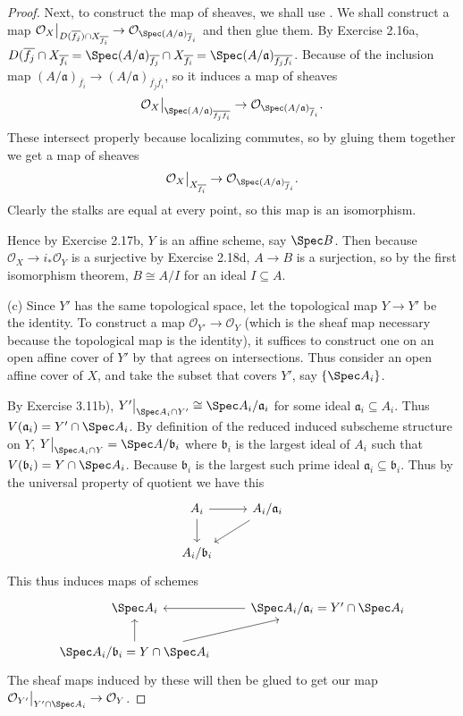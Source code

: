 \begin{proof}
	Next, to construct the map of sheaves, we shall use .
	We shall construct a map $\mathcal{O}_X\big|_{D(\overline{f_j})\cap X_{\overline{f_i} }} \to \mathcal{O}_{\Spec (A / \mathfrak{a})_{\overline{f}_i }} $ and then glue them.
	By Exercise 2.16a, $D(\overline{f_j}\cap X_{\overline{f_i} } = \Spec (A / \mathfrak{a})_{\overline{f_j}} \cap X_{\overline{f_i} } = \Spec (A / \mathfrak{a})_{\overline{f_j} \overline{f_i} }  $.
	Because of the inclusion map $(A / \mathfrak{a})_{\overline{f_i} } \to (A / \mathfrak{a})_{\overline{f_j}\overline{f_i}  } $, so it induces a map of sheaves
	\[
		                   \mathcal{O}_X\big|_{\Spec (A / \mathfrak{a})_{\overline{f_j}\overline{f_i}  }} \to \mathcal{O}_{\Spec (A / \mathfrak{a})_{\overline{f}_i }}
	.\]
	These intersect properly because localizing commutes, so by gluing them together we get a map of sheaves
	\[
		\mathcal{O}_X\big|_{X_{\overline{f_i} }}\to \mathcal{O}_{\Spec (A / \mathfrak{a})_{\overline{f}_i }}
	.\]
	Clearly the stalks are equal at every point, so this map is an isomorphism.

	Hence by Exercise 2.17b, $Y $ is an affine scheme, say $\Spec B$.
	Then because $\mathcal{O}_X \to i_\ast \mathcal{O}_Y$ is a surjective by Exercise 2.18d, $A \to B$ is a surjection, so by the first isomorphism theorem, $B \cong A / I $ for an ideal $I \subseteq A $.

	(c) Since $Y' $ has the same topological space, let the topological map $Y \to Y'$ be the identity.
	To construct a map $\mathcal{O}_{Y'} \to \mathcal{O}_{Y}$ (which is the sheaf map necessary because the topological map is the identity), it suffices to construct one on an open affine cover of $Y' $ by  that agrees on intersections.
	Thus consider an open affine cover of $X $, and take the subset that covers $Y' $, say $\{\Spec A_i\}   $.

	By Exercise 3.11b), $Y'\big|_{\Spec A_i\cap Y'} \cong \Spec A_i / \mathfrak{a}_i $ for some ideal $\mathfrak{a}_i \subseteq A_i$.
	Thus $V(\mathfrak{a}_i) = Y'\cap \Spec A_i $.
	By definition of the reduced induced subscheme structure on $Y $, $Y\big|_{\Spec A_i \cap Y} = \Spec A / \mathfrak{b}_i$ where $\mathfrak{b}_i $ is the largest ideal of $A_i $ such that $V(\mathfrak{b}_i) = Y\cap \Spec A_i $.
	Because $\mathfrak{b}_i $ is the largest such prime ideal $\mathfrak{a}_i \subseteq \mathfrak{b}_i $.
	Thus by the universal property of quotient we have this
	\[\begin{tikzcd}
		{A_i} & {A_i / \mathfrak{a}_i} \\
		{A_i /\mathfrak{b}_i}
		\arrow[from=1-1, to=1-2]
		\arrow[from=1-1, to=2-1]
		\arrow[from=1-2, to=2-1]
	\end{tikzcd}\]
	This thus induces maps of schemes
	\[
		\begin{tikzcd}
			{\Spec A_i} & {\Spec A_i / \mathfrak{a}_i} = Y' \cap \Spec A_i\\
			{\Spec A_i /\mathfrak{b}_i} = Y \cap \Spec A_i
			\arrow[from=1-2, to=1-1]
			\arrow[from=2-1, to=1-1]
			\arrow[from=2-1, to=1-2]
		\end{tikzcd}
	\]
	The sheaf maps induced by these will then be glued to get our map $\mathcal{O}_{Y'}\big|_{Y'\cap \Spec A_i}\to \mathcal{O}_Y $.


\end{proof}
